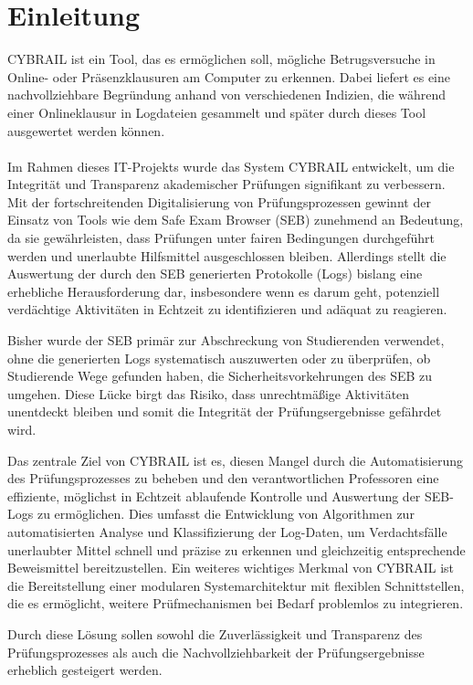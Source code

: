 \chapter{Einleitung} \label{ch:einleitung}
CYBRAIL ist ein Tool, das es ermöglichen soll, mögliche Betrugsversuche in Online- oder Präsenzklausuren am Computer zu erkennen. 
Dabei liefert es eine nachvollziehbare Begründung anhand von verschiedenen Indizien, die während einer Onlineklausur in Logdateien gesammelt und später durch dieses Tool ausgewertet werden können.\\
\\
Im Rahmen dieses IT-Projekts wurde das System CYBRAIL entwickelt, um die Integrität und Transparenz akademischer Prüfungen signifikant zu verbessern. Mit der fortschreitenden Digitalisierung von Prüfungsprozessen gewinnt der Einsatz von Tools wie dem Safe Exam Browser (SEB) zunehmend an Bedeutung, da sie gewährleisten, dass Prüfungen unter fairen Bedingungen durchgeführt werden und unerlaubte Hilfsmittel ausgeschlossen bleiben. Allerdings stellt die Auswertung der durch den SEB generierten Protokolle (Logs) bislang eine erhebliche Herausforderung dar, insbesondere wenn es darum geht, potenziell verdächtige Aktivitäten in Echtzeit zu identifizieren und adäquat zu reagieren.

Bisher wurde der SEB primär zur Abschreckung von Studierenden verwendet, ohne die generierten Logs systematisch auszuwerten oder zu überprüfen, ob Studierende Wege gefunden haben, die Sicherheitsvorkehrungen des SEB zu umgehen. Diese Lücke birgt das Risiko, dass unrechtmäßige Aktivitäten unentdeckt bleiben und somit die Integrität der Prüfungsergebnisse gefährdet wird.

Das zentrale Ziel von CYBRAIL ist es, diesen Mangel durch die Automatisierung des Prüfungsprozesses zu beheben und den verantwortlichen Professoren eine effiziente, möglichst in Echtzeit ablaufende Kontrolle und Auswertung der SEB-Logs zu ermöglichen. Dies umfasst die Entwicklung von Algorithmen zur automatisierten Analyse und Klassifizierung der Log-Daten, um Verdachtsfälle unerlaubter Mittel schnell und präzise zu erkennen und gleichzeitig entsprechende Beweismittel bereitzustellen. Ein weiteres wichtiges Merkmal von CYBRAIL ist die Bereitstellung einer modularen Systemarchitektur mit flexiblen Schnittstellen, die es ermöglicht, weitere Prüfmechanismen bei Bedarf problemlos zu integrieren.

Durch diese Lösung sollen sowohl die Zuverlässigkeit und Transparenz des Prüfungsprozesses als auch die Nachvollziehbarkeit der Prüfungsergebnisse erheblich gesteigert werden.

